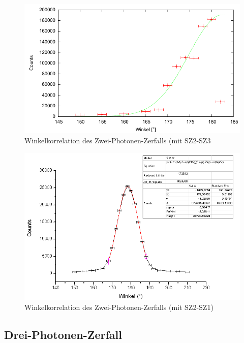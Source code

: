 \begin{figure}
 \includegraphics[width=\textwidth]{Graphen/2er/erste.pdf}
 \caption{Winkelkorrelation des Zwei-Photonen-Zerfalls (mit SZ2-SZ3}
\end{figure}


\begin{figure}
 \includegraphics[width=\textwidth]{Graphen/180K.png}
 \caption{Winkelkorrelation des Zwei-Photonen-Zerfalls (mit SZ2-SZ1)}
\end{figure}

\subsection{Drei-Photonen-Zerfall}

